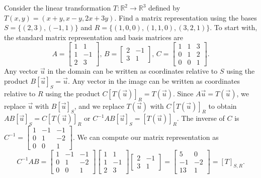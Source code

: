 \begin{example}
Consider the linear transformation $T\colon{\mathbb{R}}^2\to {\mathbb{R}}^3$ defined by $T(x,y)=(x+y,x-y,2x+3y)$. Find a matrix representation using the bases $S=\{(2,3),(-1,1)\}$ and $R=\{(1,0,0),(1,1,0),(3,2,1)\}$.  To start with, the standard matrix representation and basis matrices are 
$$
A=
\begin{bmatrix}
 1 & 1 \\
 1 & -1 \\
 2 & 3
\end{bmatrix},\,
B=
\begin{bmatrix}
 2 & -1 \\
 3 & 1
\end{bmatrix}
,\,
C=
\begin{bmatrix}
 1 & 1 & 3 \\
 0 & 1 & 2 \\
 0 & 0 & 1
\end{bmatrix}
.$$
Any vector $\vec u$ in the domain can be written as coordinates relative to $S$ using the product $ B[\vec u]_S=\vec u$.
Any vector in the image can be written as coordinates relative to $R$ using the product $C[T(\vec u)]_{R} = T(\vec u)$.  Since $A\vec u = T(\vec u)$, we replace $\vec u$ with $B[\vec u]_S$, and we replace $T(\vec u)$ with $C[T(\vec u)]_{R}$ to obtain $AB[\vec u]_S = C[T(\vec u)]_{R}$ or $C^{-1}AB[\vec u]_S=[T(\vec u)]_{R}$.  The inverse of $C$ is 
$
C^{-1}=
\begin{bmatrix}
 1 & -1 & -1 \\
 0 & 1 & -2 \\
 0 & 0 & 1
\end{bmatrix}
$.  
We can compute our matrix representation as 
$$C^{-1}AB = 
\begin{bmatrix}
 1 & -1 & -1 \\
 0 & 1 & -2 \\
 0 & 0 & 1
\end{bmatrix}
\begin{bmatrix}
 1 & 1 \\
 1 & -1 \\
 2 & 3
\end{bmatrix}
\begin{bmatrix}
 2 & -1 \\
 3 & 1
\end{bmatrix}
=
\begin{bmatrix}
 5 & 0 \\
 -1 & -2 \\
 13 & 1
\end{bmatrix}=[T]_{S,R}.
$$
\end{example}

